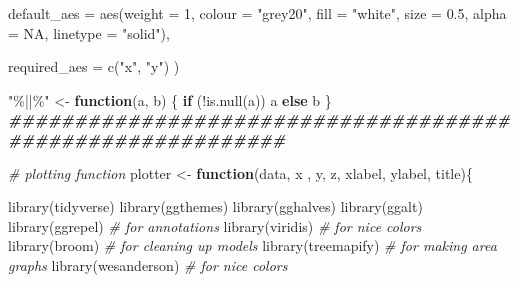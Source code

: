 \documentclass[a4paper,nobind]{templates/ociamthesis}
\newenvironment{Shaded}{\begin{snugshade}}{\end{snugshade}}
\newcommand{\AttributeTok}[1]{\textcolor[rgb]{0.77,0.63,0.00}{#1}}
\newcommand{\CommentTok}[1]{\textcolor[rgb]{0.56,0.35,0.01}{\textit{#1}}}
\newcommand{\ConstantTok}[1]{\textcolor[rgb]{0.00,0.00,0.00}{#1}}
\newcommand{\ControlFlowTok}[1]{\textcolor[rgb]{0.13,0.29,0.53}{\textbf{#1}}}
\newcommand{\DecValTok}[1]{\textcolor[rgb]{0.00,0.00,0.81}{#1}}
\newcommand{\DocumentationTok}[1]{\textcolor[rgb]{0.56,0.35,0.01}{\textbf{\textit{#1}}}}
\newcommand{\FloatTok}[1]{\textcolor[rgb]{0.00,0.00,0.81}{#1}}
\newcommand{\FunctionTok}[1]{\textcolor[rgb]{0.00,0.00,0.00}{#1}}
\newcommand{\NormalTok}[1]{#1}
\newcommand{\OtherTok}[1]{\textcolor[rgb]{0.56,0.35,0.01}{#1}}
\newcommand{\SpecialCharTok}[1]{\textcolor[rgb]{0.00,0.00,0.00}{#1}}
\newcommand{\StringTok}[1]{\textcolor[rgb]{0.31,0.60,0.02}{#1}}
\renewenvironment{Shaded}
{
  \vspace{10pt}%
  \begin{snugshade}%
}{%
  \end{snugshade}%
  \vspace{8pt}%
}
\begin{document}
\begin{landscape}
\begin{Shaded}
\begin{Highlighting}[]
          \AttributeTok{default\_aes =} \FunctionTok{aes}\NormalTok{(}\AttributeTok{weight =} \DecValTok{1}\NormalTok{, }\AttributeTok{colour =} \StringTok{"grey20"}\NormalTok{, }\AttributeTok{fill =} \StringTok{"white"}\NormalTok{, }\AttributeTok{size =} \FloatTok{0.5}\NormalTok{,}
                            \AttributeTok{alpha =} \ConstantTok{NA}\NormalTok{, }\AttributeTok{linetype =} \StringTok{"solid"}\NormalTok{),}

          \AttributeTok{required\_aes =} \FunctionTok{c}\NormalTok{(}\StringTok{"x"}\NormalTok{, }\StringTok{"y"}\NormalTok{)}
\NormalTok{  )}


\StringTok{"\%||\%"} \OtherTok{\textless{}{-}} \ControlFlowTok{function}\NormalTok{(a, b) \{}
  \ControlFlowTok{if}\NormalTok{ (}\SpecialCharTok{!}\FunctionTok{is.null}\NormalTok{(a)) a }\ControlFlowTok{else}\NormalTok{ b}
\NormalTok{\}}
\DocumentationTok{\#\#\#\#\#\#\#\#\#\#\#\#\#\#\#\#\#\#\#\#\#\#\#\#\#\#\#\#\#\#\#\#\#\#\#\#\#\#\#\#\#\#\#\#\#\#\#\#\#\#\#\#\#\#\#\#\#\#\#}
\end{Highlighting}
\end{Shaded}

\begin{Shaded}
\begin{Highlighting}[]
\CommentTok{\# plotting function}
\NormalTok{plotter }\OtherTok{\textless{}{-}} \ControlFlowTok{function}\NormalTok{(data, x , y, z, xlabel, ylabel, title)\{}
  
  \FunctionTok{library}\NormalTok{(tidyverse)}
  \FunctionTok{library}\NormalTok{(ggthemes)}
  \FunctionTok{library}\NormalTok{(gghalves)}
  \FunctionTok{library}\NormalTok{(ggalt)  }
  \FunctionTok{library}\NormalTok{(ggrepel)  }\CommentTok{\# for annotations}
  \FunctionTok{library}\NormalTok{(viridis)  }\CommentTok{\# for nice colors}
  \FunctionTok{library}\NormalTok{(broom)  }\CommentTok{\# for cleaning up models}
  \FunctionTok{library}\NormalTok{(treemapify)  }\CommentTok{\# for making area graphs}
  \FunctionTok{library}\NormalTok{(wesanderson)  }\CommentTok{\# for nice colors}
  

\end{Highlighting}
\end{Shaded}
\end{landscape}
\end{document}
